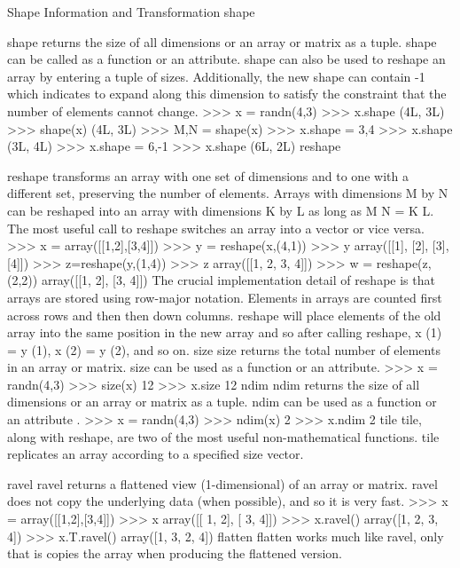
Shape Information and Transformation
shape

shape returns the size of all dimensions or an array or matrix as a tuple. shape can be called as a function
or an attribute. shape can also be used to reshape an array by entering a tuple of sizes. Additionally, the
new shape can contain -1 which indicates to expand along this dimension to satisfy the constraint that
the number of elements cannot change.
>>> x = randn(4,3)
>>> x.shape
(4L, 3L)
>>> shape(x)
(4L, 3L)
>>> M,N = shape(x)
>>> x.shape = 3,4
>>> x.shape
(3L, 4L)
>>> x.shape = 6,-1
>>> x.shape
(6L, 2L)
reshape

reshape transforms an array with one set of dimensions and to one with a different set, preserving the
number of elements. Arrays with dimensions M by N can be reshaped into an array with dimensions K
by L as long as M N = K L. The most useful call to reshape switches an array into a vector or vice versa.
>>> x = array([[1,2],[3,4]])
>>> y = reshape(x,(4,1))
>>> y
array([[1],
[2],
[3],
[4]])
>>> z=reshape(y,(1,4))
>>> z
array([[1, 2, 3, 4]])
>>> w = reshape(z,(2,2))
array([[1, 2],
[3, 4]])
The crucial implementation detail of reshape is that arrays are stored using row-major notation. Elements
in arrays are counted first across rows and then then down columns. reshape will place elements of the
old array into the same position in the new array and so after calling reshape, x (1) = y (1), x (2) = y (2),
and so on.
size
size returns the total number of elements in an array or matrix. size can be used as a function or an
attribute.
>>> x = randn(4,3)
>>> size(x)
12
>>> x.size
12
ndim
ndim returns the size of all dimensions or an array or matrix as a tuple. ndim can be used as a function or
an attribute .
>>> x = randn(4,3)
>>> ndim(x)
2
>>> x.ndim
2
tile
tile, along with reshape, are two of the most useful non-mathematical functions. tile replicates an array
according to a specified size vector. 


ravel
ravel returns a flattened view (1-dimensional) of an array or matrix. ravel does not copy the underlying
data (when possible), and so it is very fast.
>>> x = array([[1,2],[3,4]])
>>> x
array([[ 1, 2],
[ 3, 4]])
>>> x.ravel()
array([1, 2, 3, 4])
>>> x.T.ravel()
array([1, 3, 2, 4])
flatten
flatten works much like ravel, only that is copies the array when producing the flattened version.


